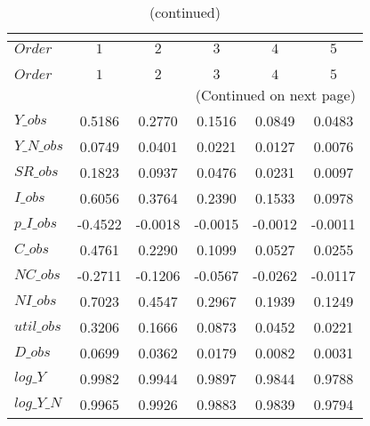  
\begin{center}
\begin{longtable}{lccccc} 
\caption{COEFFICIENTS OF AUTOCORRELATION}\\
 \label{Table:th_autocorr_matrix}\\
\toprule 
$Order      $	 & 	 $          1$	 & 	 $          2$	 & 	 $          3$	 & 	 $          4$	 & 	 $          5$\\
\midrule \endfirsthead 
\caption{(continued)}\\
 \toprule \\ 
$Order      $	 & 	 $          1$	 & 	 $          2$	 & 	 $          3$	 & 	 $          4$	 & 	 $          5$\\
\midrule \endhead 
\midrule \multicolumn{6}{r}{(Continued on next page)} \\ \bottomrule \endfoot 
\bottomrule \endlastfoot 
$Y\_obs     $	 & 	     0.5186	 & 	     0.2770	 & 	     0.1516	 & 	     0.0849	 & 	     0.0483 \\ 
$Y\_N\_obs  $	 & 	     0.0749	 & 	     0.0401	 & 	     0.0221	 & 	     0.0127	 & 	     0.0076 \\ 
$SR\_obs    $	 & 	     0.1823	 & 	     0.0937	 & 	     0.0476	 & 	     0.0231	 & 	     0.0097 \\ 
$I\_obs     $	 & 	     0.6056	 & 	     0.3764	 & 	     0.2390	 & 	     0.1533	 & 	     0.0978 \\ 
$p\_I\_obs  $	 & 	    -0.4522	 & 	    -0.0018	 & 	    -0.0015	 & 	    -0.0012	 & 	    -0.0011 \\ 
$C\_obs     $	 & 	     0.4761	 & 	     0.2290	 & 	     0.1099	 & 	     0.0527	 & 	     0.0255 \\ 
$NC\_obs    $	 & 	    -0.2711	 & 	    -0.1206	 & 	    -0.0567	 & 	    -0.0262	 & 	    -0.0117 \\ 
$NI\_obs    $	 & 	     0.7023	 & 	     0.4547	 & 	     0.2967	 & 	     0.1939	 & 	     0.1249 \\ 
$util\_obs  $	 & 	     0.3206	 & 	     0.1666	 & 	     0.0873	 & 	     0.0452	 & 	     0.0221 \\ 
$D\_obs     $	 & 	     0.0699	 & 	     0.0362	 & 	     0.0179	 & 	     0.0082	 & 	     0.0031 \\ 
$log\_Y     $	 & 	     0.9982	 & 	     0.9944	 & 	     0.9897	 & 	     0.9844	 & 	     0.9788 \\ 
$log\_Y\_N  $	 & 	     0.9965	 & 	     0.9926	 & 	     0.9883	 & 	     0.9839	 & 	     0.9794 \\ 

\end{longtable}
\end{center}
